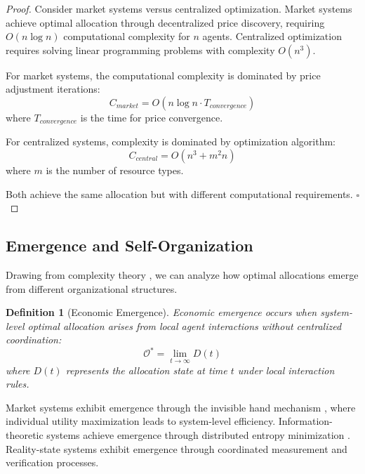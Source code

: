 \documentclass[12pt,a4paper]{article}
\newtheorem{definition}[theorem]{Definition}
\begin{document}
\begin{proof}
Consider market systems versus centralized optimization. Market systems achieve optimal allocation through decentralized price discovery, requiring $O(n \log n)$ computational complexity for $n$ agents. Centralized optimization requires solving linear programming problems with complexity $O(n^3)$.

For market systems, the computational complexity is dominated by price adjustment iterations:
\begin{equation}
C_{market} = O(n \log n \cdot T_{convergence})
\end{equation}
where $T_{convergence}$ is the time for price convergence.

For centralized systems, complexity is dominated by optimization algorithm:
\begin{equation}
C_{central} = O(n^3 + m^2 n)
\end{equation}
where $m$ is the number of resource types.

Both achieve the same allocation but with different computational requirements. $\square$
\end{proof}

\subsection{Emergence and Self-Organization}

Drawing from complexity theory \cite{holland1992,arthur1994,mitchell2009}, we can analyze how optimal allocations emerge from different organizational structures.

\begin{definition}[Economic Emergence]
Economic emergence occurs when system-level optimal allocation arises from local agent interactions without centralized coordination:
\begin{equation}
\mathcal{O}^* = \lim_{t \to \infty} D(t)
\end{equation}
where $D(t)$ represents the allocation state at time $t$ under local interaction rules.
\end{definition}

Market systems exhibit emergence through the invisible hand mechanism \cite{smith1776}, where individual utility maximization leads to system-level efficiency. Information-theoretic systems achieve emergence through distributed entropy minimization \cite{jaynes1957}. Reality-state systems exhibit emergence through coordinated measurement and verification processes.
\end{document}

